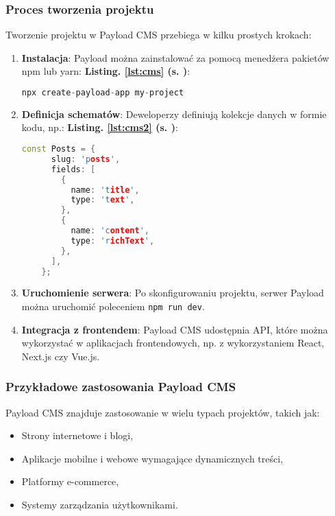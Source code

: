 \subsubsection{Proces tworzenia projektu}
Tworzenie projektu w Payload CMS przebiega w kilku prostych krokach:
\begin{enumerate}
	\item \textbf{Instalacja}: Payload można zainstalować za pomocą menedżera pakietów npm lub yarn:
	      \textbf{Listing. \ref{lst:cms} (s. \pageref{lst:cms})}:
	      \begin{lstlisting}[language=C++, caption=Tworznie cms , label={lst:cms}]
    npx create-payload-app my-project
    \end{lstlisting}
	\item \textbf{Definicja schematów}: Deweloperzy definiują kolekcje danych w formie kodu, np.:
	      \textbf{Listing. \ref{lst:cms2} (s. \pageref{lst:cms2})}:
	      \begin{lstlisting}[language=C++, caption=Przykład deklaracji w Payload CMS, label={lst:cms2}]
    const Posts = {
      slug: 'posts',
      fields: [
        {
          name: 'title',
          type: 'text',
        },
        {
          name: 'content',
          type: 'richText',
        },
      ],
    };
    \end{lstlisting}
	\item \textbf{Uruchomienie serwera}: Po skonfigurowaniu projektu, serwer Payload można uruchomić poleceniem \texttt{npm run dev}.
	\item \textbf{Integracja z frontendem}: Payload CMS udostępnia API, które można wykorzystać w aplikacjach frontendowych, np. z wykorzystaniem React, Next.js czy Vue.js.
\end{enumerate}

\subsubsection{Przykładowe zastosowania Payload CMS}
Payload CMS znajduje zastosowanie w wielu typach projektów, takich jak:
\begin{itemize}
	\item Strony internetowe i blogi,
	\item Aplikacje mobilne i webowe wymagające dynamicznych treści,
	\item Platformy e-commerce,
	\item Systemy zarządzania użytkownikami.
\end{itemize}

